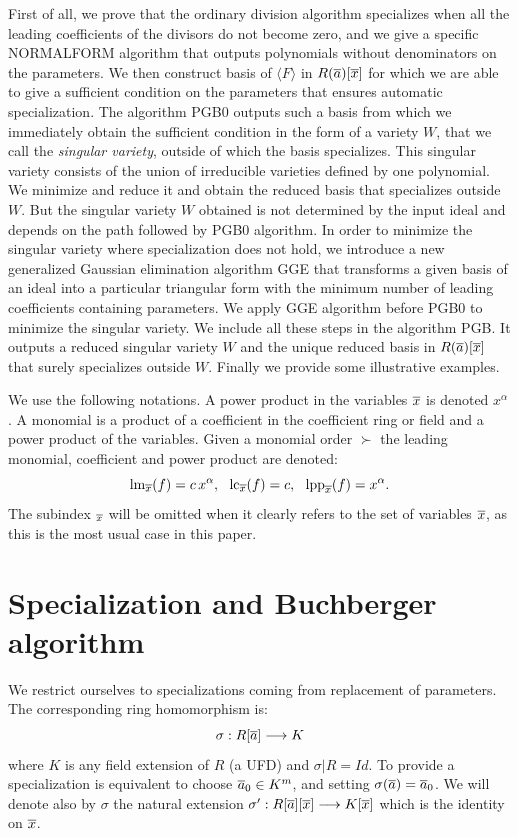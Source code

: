 First of all, we prove that the ordinary division algorithm
specializes when all the leading coefficients of the divisors do
not become zero, and we give a specific {\sc NORMALFORM} algorithm
that outputs polynomials without denominators on the parameters.
We then construct \Gr basis of $\langle F \rangle$ in
$R(\overline{a})[\overline{x}]$ for which we are able to give a sufficient condition
on the parameters that ensures automatic specialization. The
algorithm {\sc PGB0} outputs such a \Gr basis from which we
immediately obtain the sufficient condition in the form of a
variety $W$, that we call the {\em singular variety}, outside of
which the \Gr basis specializes. This singular variety consists of
the union of irreducible varieties defined by one polynomial. We
minimize and reduce it and obtain the reduced \Gr basis that
specializes outside $W$. But the singular variety $W$ obtained is
not determined by the input ideal and depends on the path followed
by {\sc PGB0} algorithm. In order to minimize the singular variety
where specialization does not hold, we introduce a new generalized
Gaussian elimination algorithm {\sc GGE} that transforms a given
basis of an ideal into a particular triangular form with the
minimum number of leading coefficients containing parameters. We
apply {\sc GGE} algorithm before {\sc PGB0} to minimize the
singular variety. We include all these steps in the algorithm {\sc
PGB}. It outputs a reduced singular variety $W$ and the unique
reduced \Gr basis in $R(\overline{a})[\overline{x}]$ that surely specializes outside
$W$. Finally we provide some illustrative examples.

We use the following notations. A power product in the variables
$\overline{x}$ is denoted $x^{\alpha}$. A monomial is a product of a
coefficient in the coefficient ring or field  and a power product
of the variables. Given a monomial order $\succ$ the leading
monomial, coefficient and power product are denoted:
  \[\hbox{\rm lm}_{\overline{x}}(f)=c\,x^\alpha, \ \
  \hbox{\rm lc}_{\overline{x}}(f)=c, \ \
  \hbox{\rm lpp}_{\overline{x}}(f)=x^\alpha.\]
The subindex $_{\overline{x}}$ will be omitted when it clearly refers to
the set of variables ${\overline{x}}$, as this is the most usual case in
this paper.

 \section{Specialization and Buchberger algorithm}

 We restrict ourselves to specializations coming from replacement
 of parameters. The corresponding ring homomorphism is:
 \begin{equation}
 \label{spec}
 \sigma:  R[\overline{a}]  \longrightarrow  K
 \end{equation}
 where $K$ is any field extension of $R$ (a UFD) and $\sigma \vert R = Id$.
 To provide a specialization is equivalent to choose
  $\overline{a}_0 \in K^m$, and setting $\sigma(\overline{a})= \overline{a}_0$. We will denote
  also by $\sigma$ the natural extension $\sigma' : R[\overline{a}][\overline{x}]
  \longrightarrow K[\overline{x}]$ which is the identity on $\overline{x}$.

